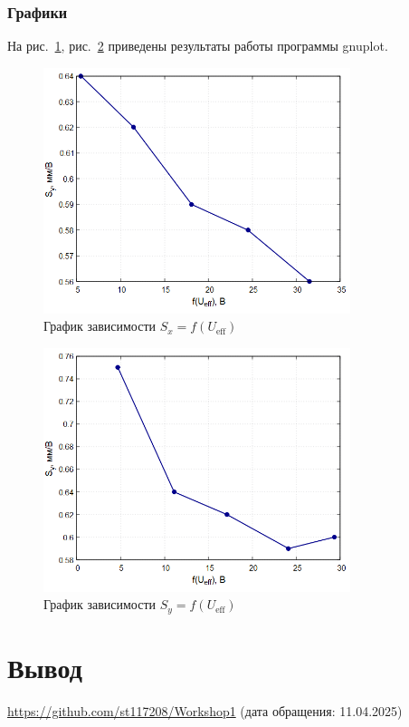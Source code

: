 \subsubsection{Графики}

На рис.~\ref{fig:plot1}, рис.~\ref{fig:plot2} приведены результаты работы программы gnuplot.

\begin{figure}
\centering
\includegraphics[width=0.8\textwidth]{plot1.png}
\caption{График зависимости $S_x = f(U_{\text{eff}})$}
\label{fig:plot1}
\end{figure}

\begin{figure}
\centering
\includegraphics[width=0.8\textwidth]{plot2.png}
\caption{График зависимости $S_y = f(U_{\text{eff}})$}
\label{fig:plot2}
\end{figure}

\section{Вывод}


\begin{thebibliography}{9}
\url{https://github.com/st117208/Workshop1}  (дата обращения: 11.04.2025)
\end{thebibliography}